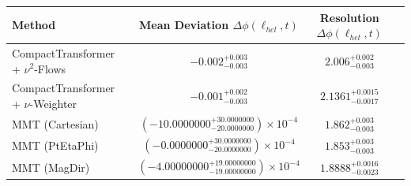     \begin{tabular}{lccc}
        \toprule
        Method & Mean Deviation $\Delta\phi(\ell_{hel}, t)$ & Resolution $\Delta\phi(\ell_{hel}, t)$ \\
        \midrule
        CompactTransformer + $\nu^2$-Flows & $-0.002^{+0.003}_{-0.003}$ & $2.006^{+0.002}_{-0.003}$ \\
        CompactTransformer + $\nu$-Weighter & $-0.001^{+0.002}_{-0.003}$ & $2.1361^{+0.0015}_{-0.0017}$ \\
        MMT (Cartesian) & $(-10.0000000^{+30.0000000}_{-20.0000000})\times 10^{-4}$ & $1.862^{+0.003}_{-0.003}$ \\
        MMT (PtEtaPhi) & $(-0.0000000^{+30.0000000}_{-20.0000000})\times 10^{-4}$ & $1.853^{+0.003}_{-0.003}$ \\
        MMT (MagDir) & $(-4.00000000^{+19.00000000}_{-19.00000000})\times 10^{-4}$ & $1.8888^{+0.0016}_{-0.0023}$ \\
        \bottomrule
    \end{tabular}